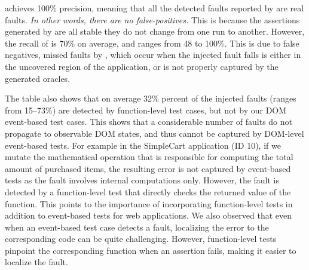 \jseft achieves 100\% precision, meaning that all the detected faults reported by \jseft are real faults. {\em In other words, there are no false-positives.}
This is because the assertions generated by \jseft are all stable \ie they do not change from one run to another. %
However, the recall of \jseft is 70\% on average, and ranges from 48 to 100\%. This is due to false negatives, \ie missed faults by \jseft, 
which occur when the injected fault falls is either in the uncovered region of the application, or is not properly captured by the generated oracles.  


The table also shows that on average 32\% percent of the injected faults (ranges from 15--73\%) are detected by function-level test cases, but not by our DOM event-based test cases. This shows that a considerable number of faults do not propagate to observable DOM states, and thus cannot be captured by DOM-level event-based tests. 
For example in the SimpleCart application (ID 10), if we mutate the mathematical operation that is responsible for computing the total amount of purchased items, the resulting error is not captured by event-based tests as the fault involves internal computations only. However, the fault is detected by a function-level test that directly checks the returned value of the function.
This points to the importance of incorporating function-level tests in addition to event-based tests for \javascript web applications. We also observed that even when an event-based test case detects a \javascript fault, localizing the error to the corresponding \javascript code can be quite challenging. However, function-level tests pinpoint the  corresponding function when an assertion fails, making it easier to localize the fault. 

